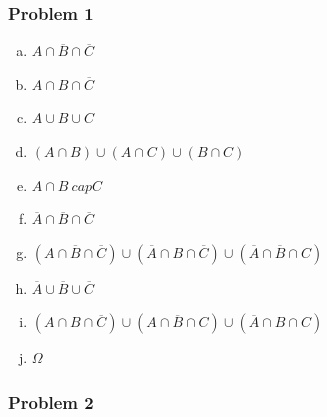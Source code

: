 \documentclass[11pt]{extarticle}
\begin{document}
\singlespacing



\subsubsection*{Problem 1}

\begin{enumerate}[(a)] 
\item $A \cap \overline{B} \cap \overline{C}$
\item $A \cap B \cap \overline{C}$
\item $A \cup B \cup C$
\item $(A \cap B) \cup (A \cap C) \cup (B \cap C)$
\item $A \cap B \	cap C$
\item $\overline{A} \cap \overline{B} \cap \overline{C}$
\item $(A \cap \overline{B} \cap \overline{C}) \cup (\overline{A} \cap B \cap \overline{C}) \cup (\overline{A} \cap \overline{B} \cap C)$
\item $ \overline{A} \cup \overline{B} \cup \overline{C} $
\item $(A \cap B \cap \overline{C}) \cup (A \cap \overline{B} \cap C) \cup (\overline{A} \cap B \cap C) $
\item $ \Omega $
\end{enumerate}

\subsubsection*{Problem 2}
\end{document}
